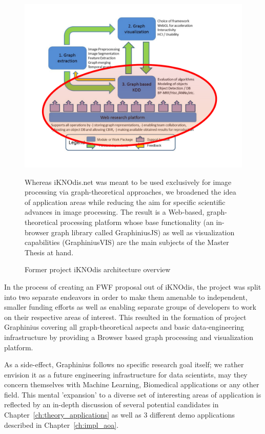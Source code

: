 \begin{figure}[ht]
	\includegraphics[width=1.1\textwidth]{figures/iKNOdis_OGMA_structure}
	\caption{Former project iKNOdis architecture overview}
	\label{fig_iKNOdis_structure}
	\small
	Whereas iKNOdis.net was meant to be used exclusively for image processing via graph-theoretical approaches, we broadened the idea of application areas while reducing the aim for specific scientific advances in image processing. The result is a Web-based, graph-theoretical processing platform whose base functionality (an in-browser graph library called GraphiniusJS) as well as visualization capabilities (GraphiniusVIS) are the main subjects of the Master Thesis at hand.
\end{figure}

In the process of creating an FWF proposal out of iKNOdis, the project was split into two separate endeavors in order to make them amenable to independent, smaller funding efforts as well as enabling separate groups of developers to work on their respective areas of interest. This resulted in the formation of project Graphinius covering all graph-theoretical aspects and basic data-engineering infrastructure \cite{DataAnalysisDSWorkflow} by providing a Browser based graph processing and visualization platform.

As a side-effect, Graphinius follows no specific research goal itself; we rather envision it as a future engineering infrastructure for data scientists, may they concern themselves with Machine Learning, Biomedical applications or any other field. This mental 'expansion' to a diverse set of interesting areas of application is reflected by an in-depth discussion of several potential candidates in Chapter~\ref{ch:theory_applications} as well as 3 different demo applications described in Chapter~\ref{ch:impl_aoa}.


